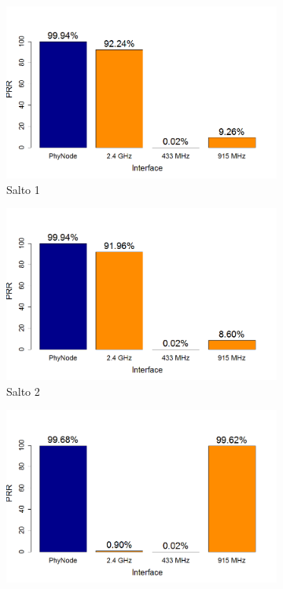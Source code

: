 \documentclass[
	12pt,				%
	openright,			%
	oneside,
	a4paper,			%
	english,			%
	french,				%
	spanish,			%
	brazil				%
	]{abntex2}
\begin{document}
\begin{figure}[b!]
	\centering
	\caption{PRR (Triangle)}
	\label{fig_prr_opt}
	\begin{subfigure}{.5\textwidth}
		\centering
		\includegraphics[width=.98\linewidth]{PRR_OPT_Salto1}
		\captionsetup{width=.9\textwidth}
		\caption{Salto 1}
		\label{prr_opt_s1}
	\end{subfigure}%
	\begin{subfigure}{.5\textwidth}
		\centering
		\includegraphics[width=.98\linewidth]{PRR_OPT_Salto2}
		\captionsetup{width=.9\textwidth}
		\caption{Salto 2}
		\label{prr_opt_s2}
	\end{subfigure}
	\begin{subfigure}{.5\textwidth}
		\centering
		\includegraphics[width=.98\linewidth]{PRR_OPT_Salto3}

\end{subfigure}
\end{figure}
\end{document}
